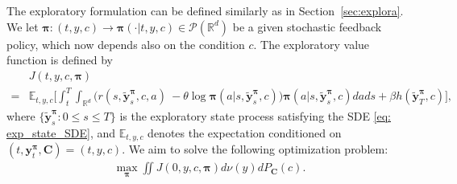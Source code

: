 \documentclass[11pt]{article}
\newcommand{\bpi}{\boldsymbol{\pi}}
\begin{document}
The exploratory formulation can be defined similarly as in Section~\ref{sec:explora}.
We let $\bpi: (t, y, c)  \rightarrow  \bpi (\cdot| t, y, c) \in \mathcal{P} (\mathbb{R}^d)$ be a given stochastic feedback policy, which now depends also on the condition $c$.
The exploratory value function is defined by
\begin{align*}
        &J(t, y, c, \bpi) \nonumber\\
        = &\mathbb{E}_{t,y, c}\bigg[  \int_t^T \int_{\mathbb{R}^d} \big( {r(s, \tilde{\mathbf{y}}_s^{\bpi}, c, a)}\ - { \theta \log \bpi(a|s, \tilde{\mathbf{y}}_{s}^{\bpi}, c)\big) \bpi(a|s, \tilde{\mathbf{y}}_{s}^{\bpi}, c) da} ds + {\beta h(\tilde{\mathbf{y}}_T^{\bpi}, c )}\bigg],
    \end{align*}
where $\{\tilde{\mathbf{y}}_{s}^{\bpi}: 0 \le s \le T\}$ is the exploratory state process satisfying the SDE \eqref{eq: exp_state_SDE}, and
$\mathbb{E}_{t, y, c}$ denotes the expectation conditioned on $(t, \mathbf{y}_t^{\bpi}, \mathbf{C}) = (t, y , c )$.
We aim to solve the following optimization problem: %
\begin{align*}%
	\max_{\bpi } \iint J(0, y, c, \bpi) d \nu(y) dP_{\mathbf{C}}(c).
\end{align*}
\end{document}
